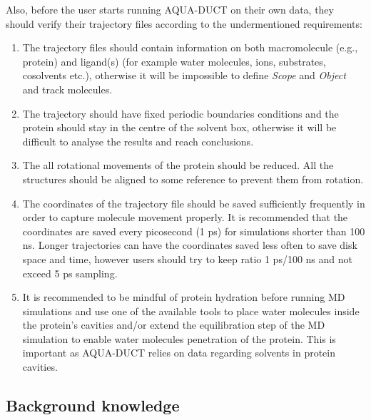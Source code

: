\documentclass[9pt,tutorial]{livecoms}
\begin{document}
Also, before the user starts running AQUA-DUCT on their own data, they should verify their trajectory files according to the undermentioned requirements:
\begin{enumerate}
\item The trajectory files should contain information on both macromolecule (e.g., protein) and ligand(s) (for example water molecules, ions, substrates, cosolvents etc.), otherwise it will be impossible to define \textit{Scope} and \textit{Object} and track molecules.
\item The trajectory should have fixed periodic boundaries conditions and the protein should stay in the centre of the solvent box, otherwise it will be difficult to analyse the results and reach conclusions.
\item The all rotational movements of the protein should be reduced. All the structures should be aligned to some reference to prevent them from rotation.
\item The coordinates of the trajectory file should be saved sufficiently frequently in order to capture molecule movement properly. It is recommended that the coordinates are saved every picosecond (1 ps) for simulations shorter than 100 ns. Longer trajectories can have the coordinates saved less often to save disk space and time, however users should try to keep ratio 1 ps/100 ns and not exceed 5 ps sampling.
\item It is recommended to be mindful of protein hydration before running MD simulations and use one of the available tools \cite{Mitusinska2020} to place water molecules inside the protein’s cavities and/or extend the equilibration step of the MD simulation to enable water molecules penetration of the protein. This is important as AQUA-DUCT relies on data regarding solvents in protein cavities. 
\end{enumerate}

\subsection{Background knowledge}
\end{document}
